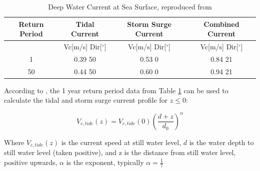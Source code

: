    
\begin{table} [H]
\centering
\begin{tabular}{ |c|c|c|c|}
\hline
Return Period & Tidal Current & Storm Surge Current & Combined Current \\
 \hline
 \hline
 & Vc[m/s] \hspace{0.3cm} Dir[$^{\circ}$] &  Vc[m/s] \hspace{0.3cm} Dir[$^{\circ}$] & Vc[m/s] \hspace{0.3cm} Dir[$^{\circ}$] \\
 \hline
 1 & 0.39 \hspace{0.7cm} 50 & 0.53 \hspace{0.7cm} 0  & 0.84 \hspace{0.7cm} 21 \\
 50 & 0.44 \hspace{0.7cm} 50 & 0.60 \hspace{0.7cm} 0  & 0.94 \hspace{0.7cm} 21 \\
 \hline
\end{tabular}
\caption{Deep Water Current at Sea Surface, reproduced from \cite{Lifes50+D1.1}}
\label{table:tidcur}
\end{table} 

\noindent According to \cite{dnvenviroment}, the 1 year return period data from Table \ref{table:tidcur} can be used to calculate the tidal and storm surge current profile for $z \leq 0$:

 \begin{equation}
      V_{c,tide}(z)= V_{c,tide}(0) \left( \frac{d+z}{d_0}\right)^{\alpha}
  \end{equation}
  
  \noindent Where $ V_{c,tide}(z)$ is the current speed at still water level, $d$ is the water depth to still water level (taken positive), and z is the distance from still water level, positive upwards, $\alpha$ is the exponent, typically $\alpha = \frac{1}{7}$

